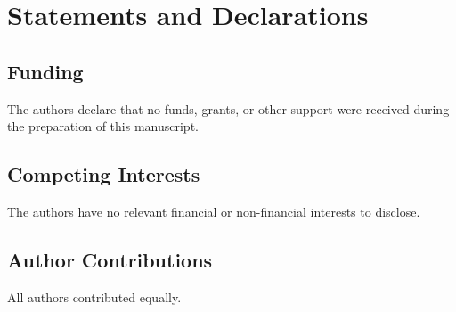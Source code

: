 \documentclass[12pt,reqno]{amsart}
\theoremstyle{definition}
\begin{document}
\section{Statements and Declarations}
\subsection*{Funding} The authors declare that no funds, grants, or other support were received during the preparation of this manuscript.

\subsection*{Competing Interests} The authors have no relevant financial or non-financial interests to disclose.

\subsection*{Author Contributions} All authors contributed equally.
\end{document}
